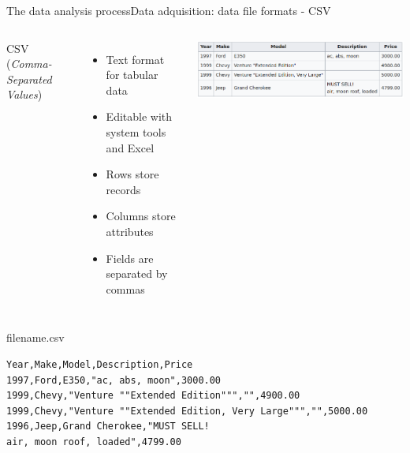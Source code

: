 \documentclass[10pt,compress]{beamer} %
\begin{document}
\begin{frame}[fragile]{The data analysis process}{Data adquisition: data file formats - CSV}
	\begin{columns}
	CSV (\textit{Comma-Separated Values}) 
		\begin{itemize}
		\item Text format for tabular data
        \item Editable with system tools and Excel
        \item Rows store records
        \item Columns store attributes
        \item Fields are separated by commas
		\end{itemize}

		\includegraphics[width=\linewidth]{figs/csv.png}
    \end{columns}

	\begin{columns}
        \begin{exampleblock}{filename.csv}
		\begin{lstlisting}[basicstyle=\scriptsize]
Year,Make,Model,Description,Price
1997,Ford,E350,"ac, abs, moon",3000.00
1999,Chevy,"Venture ""Extended Edition""","",4900.00
1999,Chevy,"Venture ""Extended Edition, Very Large""","",5000.00
1996,Jeep,Grand Cherokee,"MUST SELL!
air, moon roof, loaded",4799.00
\end{lstlisting}
        \end{exampleblock}
	\end{columns}
\end{frame}
\end{document}

